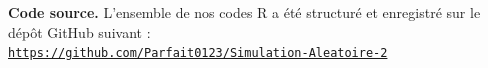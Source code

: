 \documentclass[11pt,a4paper,twoside]{article}
\begin{document}
\bigskip
\begin{res}
\centering{}
\textbf{Code source.} L'ensemble de nos codes R a été structuré et enregistré sur le dépôt GitHub suivant :\\[4pt]
\href{https://github.com/Parfait0123/Simulation-Aleatoire-2}{\texttt{https://github.com/Parfait0123/Simulation-Aleatoire-2}}
\end{res}
\end{document}

